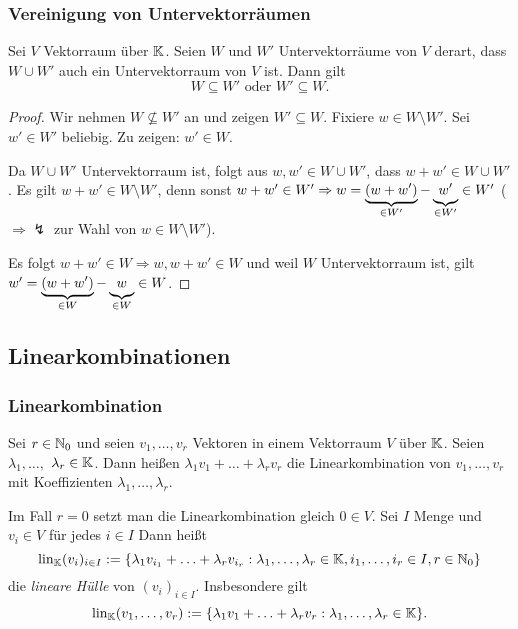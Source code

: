 \subsubsection{Vereinigung von Untervektorräumen}
\begin{propn}
	Sei $ V $ Vektorraum über $ \mathbb K $. Seien $ W $ und $ W' $ Untervektorräume von $ V $ derart, dass $ W \cup W' $ auch ein Untervektorraum von $ V $ ist. Dann gilt
	\begin{equation*}
		W \subseteq W' \text{ oder } W' \subseteq W.
	\end{equation*}
\end{propn}
\begin{proof}
	Wir nehmen $ W \not\subseteq W' $ an und zeigen $ W' \subseteq W $. Fixiere $ w \in W \setminus W' $. Sei $ w' \in W' $ beliebig. Zu zeigen: $ w' \in W $.
	
	Da $ W \cup W' $ Untervektorraum ist, folgt aus $ w,w' \in W \cup W' $, dass $ w + w' \in W \cup W' $. Es gilt $ w + w' \in W \setminus W' $, denn sonst $ w+w' \in W' \Rightarrow w = \underbrace{\left( w+w' \right)}_{ \in W'} - \underbrace{\vphantom{\left( w' \right)} w'}_{\in W'} \in W' $ ($ \Rightarrow \lightning $ zur Wahl von $ w \in W \setminus W' $).

	Es folgt $ w+w' \in W \Rightarrow w, w+w' \in W $ und weil $ W $ Untervektorraum ist, gilt $ w' = \underbrace{(w+w')}_{\in W} - \underbrace{\vphantom{\left( w' \right)} w}_{\in W} \in W $.
\end{proof}

\subsection{Linearkombinationen}
\subsubsection{Linearkombination}
Sei $ r \in \mathbb N_0 $ und seien $ v_1, \ldots, v_r $ Vektoren in einem Vektorraum $ V $ über $ \mathbb K $. Seien  $ \lambda_1, \ldots, $ $ \lambda_r \in \mathbb K $. Dann heißen $ \lambda_1 v_1 + \ldots + \lambda_r v_r $ die Linearkombination von $ v_1, \ldots, v_r $ mit Koeffizienten $ \lambda_1, \ldots, \lambda_r $.
	
Im Fall $ r = 0 $ setzt man die Linearkombination gleich $ 0 \in V $. Sei $ I $ Menge und $ v_i \in V $ für jedes $ i \in I $ Dann heißt
\begin{equation}
	\operatorname{lin}_\mathbb K (v_i)_{i \in I} := \{ \lambda_1 v_{i_1} + \ldots + \lambda_r v_{i_r} : \lambda_1, \ldots, \lambda_r \in \mathbb K, i_1, \ldots, i_r \in I, r \in \mathbb N_0 \}
\end{equation}  
die \emph{lineare Hülle} von $ (v_i)_{i \in I} $. Insbesondere gilt
\begin{equation}
	\operatorname{lin}_\mathbb K (v_1, \ldots, v_r) := \{ \lambda_1 v_1 + \ldots + \lambda_r v_r : \lambda_1, \ldots, \lambda_r \in \mathbb K \}.
\end{equation}

